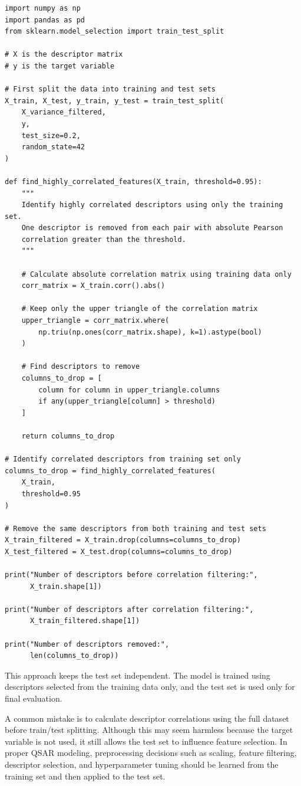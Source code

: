 \documentclass[11pt]{report}
\newenvironment{Important note}{\begin{quote}\color{red}\textbf{Important note:} }{\end{quote}}
\begin{document}
\begin{lstlisting}[style=pythonstyle, caption={Removing highly correlated descriptors using only the training set.}]
import numpy as np
import pandas as pd
from sklearn.model_selection import train_test_split

# X is the descriptor matrix
# y is the target variable

# First split the data into training and test sets
X_train, X_test, y_train, y_test = train_test_split(
    X_variance_filtered,
    y,
    test_size=0.2,
    random_state=42
)

def find_highly_correlated_features(X_train, threshold=0.95):
    """
    Identify highly correlated descriptors using only the training set.
    One descriptor is removed from each pair with absolute Pearson
    correlation greater than the threshold.
    """

    # Calculate absolute correlation matrix using training data only
    corr_matrix = X_train.corr().abs()

    # Keep only the upper triangle of the correlation matrix
    upper_triangle = corr_matrix.where(
        np.triu(np.ones(corr_matrix.shape), k=1).astype(bool)
    )

    # Find descriptors to remove
    columns_to_drop = [
        column for column in upper_triangle.columns
        if any(upper_triangle[column] > threshold)
    ]

    return columns_to_drop

# Identify correlated descriptors from training set only
columns_to_drop = find_highly_correlated_features(
    X_train,
    threshold=0.95
)

# Remove the same descriptors from both training and test sets
X_train_filtered = X_train.drop(columns=columns_to_drop)
X_test_filtered = X_test.drop(columns=columns_to_drop)

print("Number of descriptors before correlation filtering:",
      X_train.shape[1])

print("Number of descriptors after correlation filtering:",
      X_train_filtered.shape[1])

print("Number of descriptors removed:",
      len(columns_to_drop))
\end{lstlisting}

This approach keeps the test set independent. The model is trained using descriptors selected from the training data only, and the test set is used only for final evaluation.

\begin{Important note}
A common mistake is to calculate descriptor correlations using the full dataset before train/test splitting. Although this may seem harmless because the target variable is not used, it still allows the test set to influence feature selection. In proper QSAR modeling, preprocessing decisions such as scaling, feature filtering, descriptor selection, and hyperparameter tuning should be learned from the training set and then applied to the test set.
\end{Important note}
\end{document}
